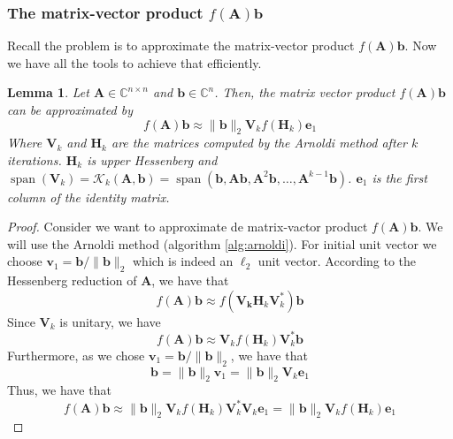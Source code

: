 \documentclass[11pt]{article}
\DeclareMathOperator{\spn}{span}
\newtheorem{lemma}{Lemma}
\numberwithin{equation}{section}
\begin{document}
\subsubsection{The matrix-vector product $f(\mathbf{A})\mathbf{b}$}
Recall the problem is to approximate the matrix-vector product $f(\mathbf{A})\mathbf{b}$. Now we have all the tools to achieve that efficiently.  
\begin{lemma}\label{lem:arnoldi1}
    Let $\mathbf{A}\in\mathbb{C}^{n\times n}$ and $\mathbf{b}\in\mathbb{C}^n$. Then, the matrix vector product $f(\mathbf{A})\mathbf{b}$ can be approximated by
    \begin{equation}
        f(\mathbf{A})\mathbf{b} \approx \|\mathbf{b}\|_2\mathbf{V}_k f(\mathbf{H}_k)\mathbf{e}_1
    \end{equation}
    Where $\mathbf{V}_k$ and $\mathbf{H}_k$ are the matrices computed by the Arnoldi method after $k$ iterations. $\mathbf{H}_k$ is upper Hessenberg and $\spn{\left(\mathbf{V}_k\right)}=\mathcal{K}_k(\mathbf{A},\mathbf{b}) = \spn{\left(\mathbf{b}, \mathbf{A}\mathbf{b}, \mathbf{A}^2\mathbf{b}, \dots, \mathbf{A}^{k-1}\mathbf{b}\right)}$. $\mathbf{e}_1$ is the first column of the identity matrix.
\end{lemma}
\begin{proof}
    Consider we want to approximate de matrix-vactor product $f(\mathbf{A})\mathbf{b}$. We will use the Arnoldi method (algorithm \ref{alg:arnoldi}). For initial unit vector we choose $\mathbf{v}_1 = \mathbf{b}/\|\mathbf{b}\|_2$ which is indeed an $\ell_2$ unit vector. According to the Hessenberg reduction of $\mathbf{A}$, we have that
    \begin{equation*}
        f(\mathbf{A})\mathbf{b} \approx f(\mathbf{V_k}\mathbf{H}_k\mathbf{V}_k^*)\mathbf{b}
    \end{equation*}
    Since $\mathbf{V}_k$ is unitary, we have
    \begin{equation*}
        f(\mathbf{A})\mathbf{b} \approx \mathbf{V}_k f(\mathbf{H}_k)\mathbf{V}_k^*\mathbf{b}
    \end{equation*}
    Furthermore, as we chose $\mathbf{v}_1 = \mathbf{b}/\|\mathbf{b}\|_2$, we have that
    \begin{equation*}
        \mathbf{b} = \|\mathbf{b}\|_2\mathbf{v}_1 = \|\mathbf{b}\|_2\mathbf{V}_k\mathbf{e}_1
    \end{equation*}
    Thus, we have that
    \begin{equation*}
        f(\mathbf{A})\mathbf{b} \approx \|\mathbf{b}\|_2\mathbf{V}_k f(\mathbf{H}_k)\mathbf{V}_k^*\mathbf{V}_k\mathbf{e}_1 = \|\mathbf{b}\|_2\mathbf{V}_k f(\mathbf{H}_k)\mathbf{e}_1
    \end{equation*}
\end{proof}
\end{document}
